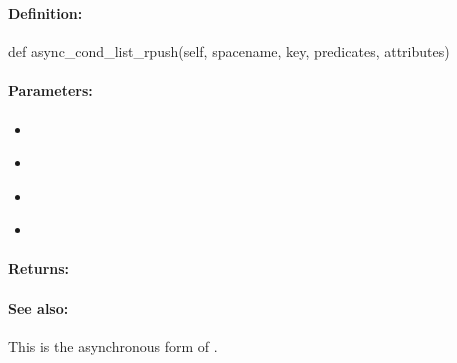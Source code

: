 \pagebreak
\subsubsection{}
\label{api:python:async_cond_list_rpush}


\paragraph{Definition:}
\begin{pythoncode}
def async_cond_list_rpush(self, spacename, key, predicates, attributes)
\end{pythoncode}

\paragraph{Parameters:}
\begin{itemize}[noitemsep]
\item {}\\

\item {}\\

\item {}\\

\item {}\\

\end{itemize}

\paragraph{Returns:}


\paragraph{See also:}  This is the asynchronous form of .

\pagebreak
\subsubsection{}
\label{api:python:set_add}


